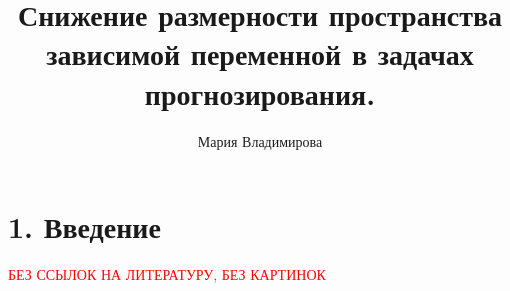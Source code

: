 \documentclass[12pt,twoside]{article}
\title
	{Снижение размерности пространства зависимой переменной в задачах прогнозирования.}
\author
	{Мария Владимирова}
\begin{document}
\maketitle


\linenumbers
\section{1. Введение}
\textcolor{red}{БЕЗ ССЫЛОК НА ЛИТЕРАТУРУ, БЕЗ КАРТИНОК}


\end{document}
